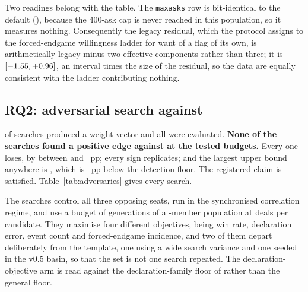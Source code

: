 \begin{table}[!ht]\centering
\caption{The rule-dialect table. Both configurations play the same dialect in every row. Per-bank
values are given in bank order, 7090003 then 7090001. This is the first dialect sweep of its kind in
the corpus and has no training-bank counterpart.}
\label{tab:dialects}
{\tabfont}
\end{table}

Two readings belong with the table. The \texttt{maxasks} row is bit-identical to the default
(\vsevenMaxasksIdentical{}), because the 400-ask cap is never reached in this population, so it
measures nothing. Consequently the legacy residual, which the protocol assigns to the forced-endgame
willingness ladder for want of a flag of its own, is arithmetically legacy minus two effective
components rather than three; it is \vsevenLegacyResidual{}
$[-1.55, +0.96]$, an interval \vsevenLegacyResidualRatio{} times
the size of the residual, so the data are equally consistent with the ladder contributing nothing.

\subsection{RQ2: adversarial search against \sestina{}}
\label{sec:results-adversarial}

\vsevenBfourFits{} of \vsevenBfourArmsWord{} searches produced a weight vector and all
\vsevenBfourArmsWord{} were evaluated. \textbf{None of the \vsevenBfourArmsWord{} searches found a positive
edge against \sestina{} at the tested budgets.} Every one loses, by between
\vsevenBfourBestLoss{} and \vsevenBfourWorstLoss{}~pp; every sign replicates; and the largest upper
bound anywhere is \vsevenBfourWorstUpper{}, which is \vsevenBfourFloorGap{}~pp below the detection
floor. The registered claim is satisfied. Table~\ref{tab:adversaries} gives every search.

\begin{table}[!ht]\centering
\caption{\vsevenBfourArms{} independently constructed adversarial searches against \sestina{}. A
positive edge would mean the adversary beats the target. Each was fitted on a deal stream disjoint
from the banks it is evaluated on. Per-bank values are given in bank order, 7090001 then 7090002.}
\label{tab:adversaries}
{\tabfont}
\end{table}

The searches control all three opposing seats, run in the synchronised correlation regime, and use a
budget of \vsevenBfourGens{} generations of a \vsevenBfourPop{}-member population at
\vsevenBfourDeals{} deals per candidate. They maximise four different objectives, being win rate,
declaration error, event count and forced-endgame incidence, and two of them depart deliberately from
the template, one using a wide search variance and one seeded in the v0.5 basin, so that the set is
not one search repeated. The declaration-objective arm is read against the declaration-family floor of
\vsevenDeclFloor{} rather than the general floor.

